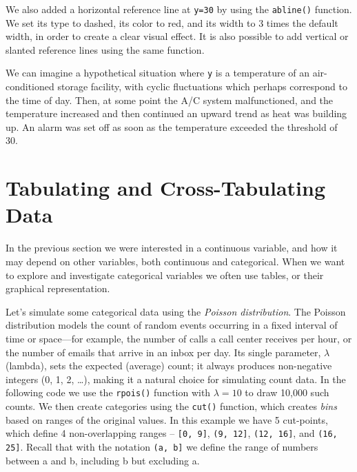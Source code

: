 We also added a horizontal reference line at \lstinline{y=30} by using the
\lstinline{abline()} function. We set its type to dashed, its color to red, and
its width to 3 times the default width, in order to create a clear visual
effect. It
is also possible to add vertical or slanted reference lines using the same
function.

We can imagine a hypothetical situation where \lstinline{y} is a temperature of
an air-conditioned storage facility, with cyclic fluctuations which perhaps
correspond to the time of day. Then, at some point the A/C system
malfunctioned, and the temperature increased and then continued an upward trend
as heat was
building up. An alarm was set off as soon as the temperature exceeded the
threshold of 30.





\section{Tabulating and Cross-Tabulating Data}
In the previous section we were interested in a continuous variable, and how it
may depend on other variables, both continuous and categorical. When we want to
explore and investigate categorical variables we often use tables, or their
graphical representation.

Let's simulate some categorical data using the \emph{Poisson
distribution}. The Poisson distribution models
the count of random events occurring in a fixed interval of time or space---for
example, the number of calls a call center receives per hour, or the number of
emails that arrive in an inbox per day. Its single parameter, $\lambda$ (lambda),
sets the expected (average) count; it always produces non-negative integers
(0, 1, 2, \ldots), making it a natural choice for simulating count data.
In the following code we use the \lstinline{rpois()} function with $\lambda = 10$
to draw 10,000 such counts. We then create categories using the
\lstinline{cut()} function, which creates \emph{bins} based on ranges of the
original values.  In this example we have 5 cut-points, which define 4
non-overlapping ranges -- \lstinline{[0, 9]}, 
\lstinline{(9, 12]}, \lstinline{(12, 16]}, and \lstinline{(16, 25]}. Recall
that with the notation \lstinline{(a, b]} we define the range of numbers
between a and b, including b but excluding a. 
 



